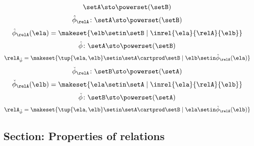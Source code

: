 \begin{forslides}
\begin{equation}
        \label{eq:slides_session2_rel_117}
        \setA  \sto \powerset (\setB)
    \end{equation}
    \begin{equation}
        \label{eq:slides_session2_rel_118}
        \hat \phi_{\relA} \colon \setA \sto \powerset (\setB)
    \end{equation}
    \begin{equation}
        \label{eq:slides_session2_rel_119}
        \hat \phi_{\relA} (\ela) = \makeset{ \elb \setin \setB \mid \inrel{\ela}{\relA}{\elb}}
    \end{equation}
    \begin{equation}
        \label{eq:slides_session2_rel_120}
        \hat \phi \colon \setA \sto \powerset (\setB)
    \end{equation}
    \begin{equation}
        \label{eq:slides_session2_rel_121}
        \relA_{\hat \phi} = \makeset{ \tup{\ela, \elb} \setin \setA \cartprod \setB \mid \elb \setin \hat \phi_{\relA}(\ela)  }
    \end{equation}
    \begin{equation}
        \label{eq:slides_session2_rel_122}
        \check \phi_{\relA} \colon \setB \sto \powerset (\setA)
    \end{equation}
    \begin{equation}
        \label{eq:slides_session2_rel_123}
        \check \phi_{\relA} (\elb) = \makeset{ \ela \setin \setA \mid \inrel{\ela}{\relA}{\elb}}
    \end{equation}
    \begin{equation}
        \label{eq:slides_session2_rel_124}
        \check \phi \colon \setB \sto \powerset (\setA)
    \end{equation}
    \begin{equation}
        \label{eq:slides_session2_rel_125}
        \relA_{\check \phi} = \makeset{ \tup{\ela, \elb} \setin \setA \cartprod \setB \mid \ela \setin \check \phi_{\relA}(\elb)}
    \end{equation}

    \subsection{Section: Properties of relations}


\end{forslides}
